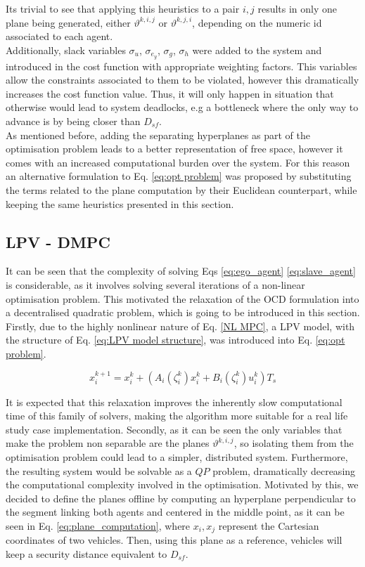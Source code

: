 \documentclass[a4paper,fleqn]{cas-sc}
\begin{document}
Its trivial to see that applying this heuristics to a pair $i,j$ results in only one plane being generated, either $\vartheta^{k,i,j}$ or $\vartheta^{k,j,i}$, depending on the numeric id associated to each agent.\\
    
Additionally, slack variables $\sigma_u$, $\sigma_{e_y}$, $\sigma_g$, $\sigma_h$ were added to the system and introduced in the cost function with appropriate weighting factors. This variables allow the constraints associated to them to be violated, however this dramatically increases the cost function value. Thus, it will only happen in situation that otherwise would lead to system deadlocks, e.g a bottleneck where the only way to advance is by being closer than $D_{sf}$. \\ 

As mentioned before, adding the separating hyperplanes as part of the optimisation problem leads to a better representation of free space, however it comes with an increased computational burden over the system. For this reason an alternative formulation to Eq. \eqref{eq:opt problem} was proposed by substituting the terms related to the plane computation by their Euclidean counterpart, while keeping the same heuristics presented in this section. 

\subsection{LPV - DMPC}
\label{sec:LPV - DMPC}
It can be seen that the complexity of solving Eqs \eqref{eq:ego_agent} \eqref{eq:slave_agent} is considerable, as it involves solving several iterations of a non-linear optimisation problem. This motivated the relaxation of the OCD formulation into a decentralised quadratic problem, which is going to be introduced in this section. Firstly, due to the highly nonlinear nature of Eq. \eqref{NL MPC}, a LPV model, with the structure of Eq. \eqref{eq:LPV model structure}, was introduced into Eq. \eqref{eq:opt problem}. 

\begin{equation}
    \label{eq:LPV model structure}
    x^{k+1}_i = x^{k}_i + ( A_i(\zeta^{k}_i) x^{k}_i + B_i(\zeta^{k}_i) u^{k}_i ) T_s
\end{equation}

It is expected that this relaxation improves the inherently slow computational time of this family of solvers, making the algorithm more suitable for a real life study case implementation. Secondly, as it can be seen the only variables that make the problem non separable are the planes $\vartheta^{k,i,j}$, so isolating them from the optimisation problem could lead to a simpler, distributed system. Furthermore, the resulting system would be solvable as a $QP$ problem, dramatically decreasing the computational complexity involved in the optimisation. Motivated by this, we decided to define the planes offline by computing an hyperplane perpendicular to the segment linking both agents and centered in the middle point, as it can be seen in Eq. \eqref{eq:plane_computation}, where $x_i,x_j$ represent the Cartesian coordinates of two vehicles. Then, using this plane as a reference, vehicles will keep a security distance equivalent to $D_{sf}$.
\end{document}
